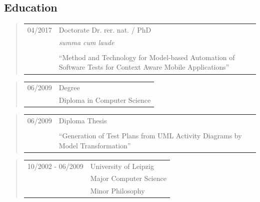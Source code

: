 \subsection*{Education} 
\begin{quote}
	\begin{tabular}{p{4cm}l}
		04/2017&Doctorate Dr. rer. nat. / PhD\\
		&\emph{summa cum laude}\\\\
		&\begin{minipage}{8cm}"`Method and Technology for Model-based Automation of Software Tests for Context Aware Mobile Applications"'
		\end{minipage}
	\end{tabular}
\end{quote}
\begin{quote}
	\begin{tabular}{p{4cm}l}
		06/2009&Degree\\ 
		&Diploma in Computer Science
	\end{tabular}
\end{quote}
\begin{quote}
	\begin{tabular}{p{4cm}l}
		06/2009&Diploma Thesis\\\\
		&\begin{minipage}{8cm}"`Generation of Test Plans from 
		UML Activity Diagrams by Model Transformation"'
		\end{minipage}
	\end{tabular}
\end{quote}
\begin{quote}
	\begin{tabular}{p{4cm}l}
		10/2002 - 06/2009&University of Leipzig\\
		&Major Computer Science\\
		&Minor Philosophy
	\end{tabular}
\end{quote}